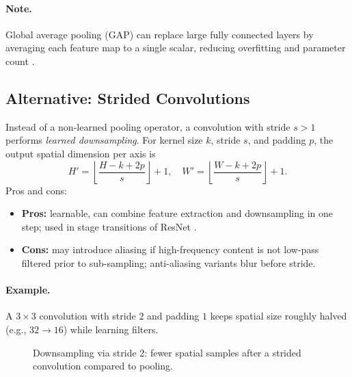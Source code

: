 \paragraph{Note.} Global average pooling (GAP) can replace large fully connected layers by averaging each feature map to a single scalar, reducing overfitting and parameter count \cite{GoodfellowEtAl2016}.

\subsection{Alternative: Strided Convolutions}
\label{subsec:strided-convs}

Instead of a non-learned pooling operator, a convolution with stride $s>1$ performs \emph{learned downsampling}. For kernel size $k$, stride $s$, and padding $p$, the output spatial dimension per axis is
\begin{equation}
H' = \left\lfloor \frac{H - k + 2p}{s} \right\rfloor + 1,\quad W' = \left\lfloor \frac{W - k + 2p}{s} \right\rfloor + 1.
\end{equation}
Pros and cons:
\begin{itemize}
    \item \textbf{Pros:} learnable, can combine feature extraction and downsampling in one step; used in stage transitions of ResNet \cite{He2016}.
    \item \textbf{Cons:} may introduce aliasing if high-frequency content is not low-pass filtered prior to sub-sampling; anti-aliasing variants blur before stride.
\end{itemize}

\paragraph{Example.} A $3\times3$ convolution with stride $2$ and padding $1$ keeps spatial size roughly halved (e.g., $32\to16$) while learning filters.

\begin{figure}[h]
    \centering
    \caption{Downsampling via stride 2: fewer spatial samples after a strided convolution compared to pooling.}
    \label{fig:strided-conv}
\end{figure}

